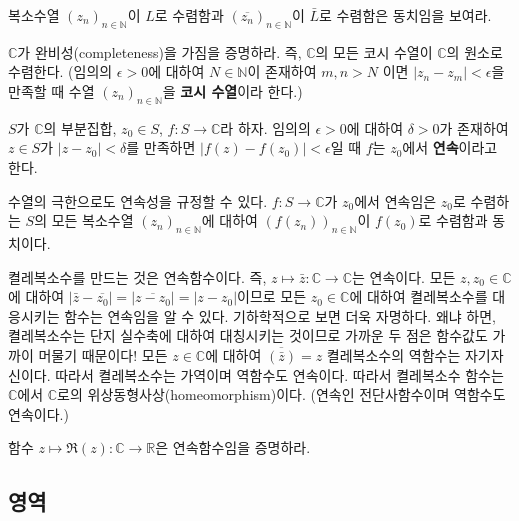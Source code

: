 \begin{salt_exercise} \label{ex-1-26}
복소수열 $(z_n)_{n\in\mathbb N}$이 $L$로 수렴함과
$(\overline{z_n})_{n\in\mathbb N}$이 $\bar L$로 수렴함은 동치임을 보여라.
\end{salt_exercise}

\begin{salt_exercise} \label{ex-1-27}
$\mathbb C$가 완비성(completeness)을 가짐을 증명하라.
즉, $\mathbb C$의 모든 코시 수열이 $\mathbb C$의 원소로 수렴한다.
(임의의 $\epsilon>0$에 대하여  $N\in\mathbb N$이 존재하여
$m,n>N$ 이면 $|z_n - z_m| < \epsilon$을 만족할 때
수열 $(z_n)_{n\in\mathbb N}$을 {\bf 코시 수열}이라 한다.)
\end{salt_exercise}

$S$가 $\mathbb C$의 부분집합, $z_0\in S$,  $f:S\to \mathbb C$라 하자.
임의의 $\epsilon>0$에 대하여 $\delta>0$가 존재하여
$z\in S$가 $|z-z_0|<\delta$를 만족하면 $|f(z)-f(z_0)|<\epsilon$일 때
$f$는 $z_0$에서 {\bf 연속}이라고 한다.

수열의 극한으로도 연속성을 규정할 수 있다.
$f:S\to\mathbb C$가 $z_0$에서 연속임은
$z_0$로 수렴하는 $S$의 모든 복소수열 $(z_n)_{n\in\mathbb N}$에 대하여
$(f(z_n))_{n\in\mathbb N}$이 $f(z_0)$로 수렴함과 동치이다.

\begin{saltexample}[label=example-1-2] {}{}
켤레복소수를 만드는 것은 연속함수이다.
즉, $z\mapsto\bar z: \mathbb C \to \mathbb C$는 연속이다.
모든 $z, z_0 \in \mathbb C$에 대하여
$|\bar z - \overline{z_0}| = |\overline{z-z_0}| = |z-z_0|$이므로
모든 $z_0\in\mathbb C$에 대하여 켤레복소수를 대응시키는 함수는
연속임을 알 수 있다.
 기하학적으로 보면 더욱 자명하다. 왜냐 하면, 켤레복소수는 단지 실수축에 대하여 
대칭시키는 것이므로 가까운 두 점은 함수값도 가까이 머물기 때문이다!
\saltvskipex
모든 $z\in\mathbb C$에 대하여 $\overline{(\bar z)} = z$ 켤레복소수의
역함수는 자기자신이다. 따라서 켤레복소수는 가역이며 역함수도 연속이다.
따라서 켤레복소수 함수는 $\mathbb C$에서 $\mathbb C$로의 
위상동형사상(homeomorphism)이다. (연속인 전단사함수이며 역함수도 연속이다.)
\end{saltexample}

\begin{salt_exercise} \label{ex-1-28}
함수 $z\mapsto \Re(z): \mathbb C \to \mathbb R$은 연속함수임을 증명하라. 
\end{salt_exercise}

\subsection{영역 \label{sec-1-3-4}}

